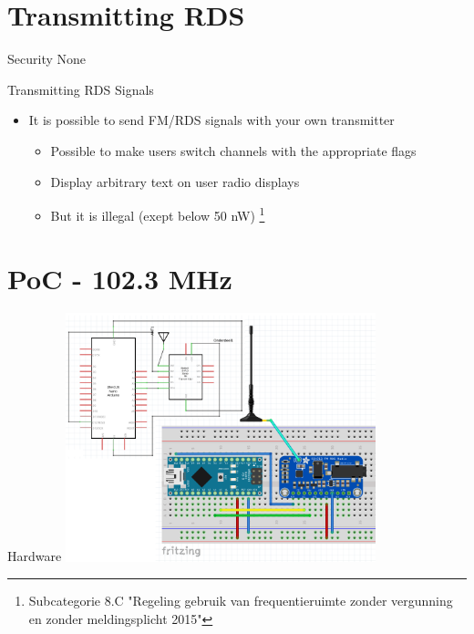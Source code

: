 \documentclass[10pt]{beamer}
\begin{document}
\section{Transmitting RDS}

\begin{frame}{Security}
    \pause \centering None
\end{frame}

\begin{frame}{Transmitting RDS Signals}

\begin{itemize}
    \item It is possible to send FM/RDS signals with your own transmitter
    \begin{itemize}
        \item Possible to make users switch channels with the appropriate flags
        \item Display arbitrary text on user radio displays
        \pause \item But it is illegal (exept below 50 nW) \footnote{\tiny{Subcategorie 8.C "Regeling gebruik van frequentieruimte zonder vergunning en zonder meldingsplicht 2015"}}
    \end{itemize}
\end{itemize}



\end{frame}

\section{PoC - 102.3 MHz}
\begin{frame}{Hardware}
    \includegraphics[width=9cm]{FMzend.png}
\end{frame}
\end{document}
